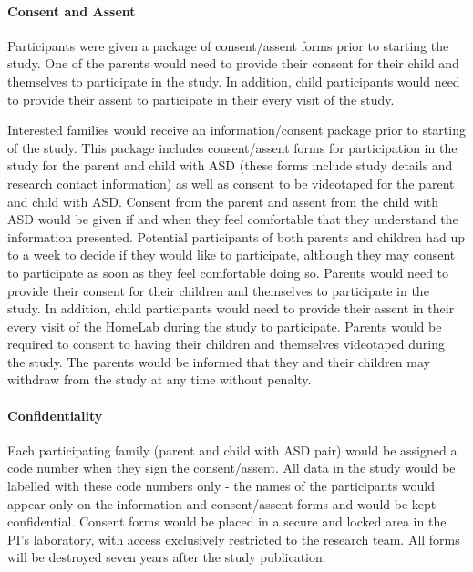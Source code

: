 \paragraph{Consent and Assent}
Participants were given a package of consent/assent forms prior to starting the study. One of the parents would need to provide their consent for their child and themselves to participate in the study. In addition, child participants would need to provide their assent to participate in their every visit of the study. 

Interested families would receive an information/consent package prior to starting of the study. This package includes consent/assent forms for participation in the study for the parent and child with ASD (these forms include study details and research contact information) as well as consent to be videotaped for the parent and child with ASD. Consent from the parent and assent from the child with ASD would be given if and when they feel comfortable that they understand the information presented. Potential participants of both parents and children had up to a week to decide if they would like to participate, although they may consent to participate as soon as they feel comfortable doing so. Parents would need to provide their consent for their children and themselves to participate in the study. In addition, child participants would need to provide their assent in their every visit of the HomeLab during the study to participate. Parents would be required to consent to having their children and themselves videotaped during the study. The parents would be informed that they and their children may withdraw from the study at any time without penalty.

\paragraph{Confidentiality}
Each participating family (parent and child with ASD pair) would be assigned a code number when they sign the consent/assent. All data in the study would be labelled with these code numbers only - the names of the participants would appear only on the information and consent/assent forms and would be kept confidential. Consent forms would be placed in a secure and locked area in the PI's laboratory, with access exclusively restricted to the research team. All forms will be destroyed seven years after the study publication. 

